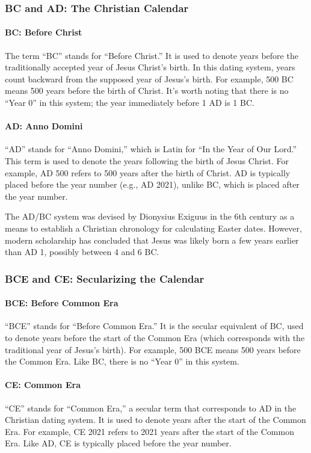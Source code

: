 \documentclass{book}
\begin{document}
\subsubsection*{BC and AD: The Christian Calendar}
\paragraph{BC: Before Christ}
The term ``BC'' stands for ``Before Christ.'' It is used to denote years before the traditionally accepted year of Jesus Christ’s birth. In this dating system, years count backward from the supposed year of Jesus’s birth. For example, 500 BC means 500 years before the birth of Christ. It’s worth noting that there is no ``Year 0'' in this system; the year immediately before 1 AD is 1 BC.

\paragraph{AD: Anno Domini}
``AD'' stands for ``Anno Domini,'' which is Latin for ``In the Year of Our Lord.'' This term is used to denote the years following the birth of Jesus Christ. For example, AD 500 refers to 500 years after the birth of Christ. AD is typically placed before the year number (e.g., AD 2021), unlike BC, which is placed after the year number.

The AD/BC system was devised by Dionysius Exiguus in the 6th century as a means to establish a Christian chronology for calculating Easter dates. However, modern scholarship has concluded that Jesus was likely born a few years earlier than AD 1, possibly between 4 and 6 BC.

\subsubsection*{BCE and CE: Secularizing the Calendar}
\paragraph{BCE: Before Common Era}
``BCE'' stands for ``Before Common Era.'' It is the secular equivalent of BC, used to denote years before the start of the Common Era (which corresponds with the traditional year of Jesus’s birth). For example, 500 BCE means 500 years before the Common Era. Like BC, there is no ``Year 0'' in this system.

\paragraph{CE: Common Era}
``CE'' stands for ``Common Era,'' a secular term that corresponds to AD in the Christian dating system. It is used to denote years after the start of the Common Era. For example, CE 2021 refers to 2021 years after the start of the Common Era. Like AD, CE is typically placed before the year number.
\end{document}

